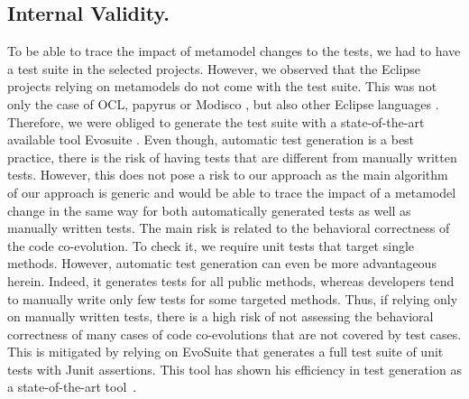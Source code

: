 \subsection{Internal Validity.}
To be able to trace the impact of metamodel changes to the tests, we had to have a test suite in the selected projects. However, we observed that the Eclipse projects relying on metamodels do not come with the test suite. This was not only the case of OCL\cite{MDTOCL}, papyrus \cite{MDTPapyrus} or Modisco \cite{MDTModisco}, but also other Eclipse languages \cite{UML241,BPMN2}. Therefore, we were obliged to generate the test suite with a state-of-the-art available tool Evosuite \cite{fraser2011evosuite}. 
Even though, automatic test generation is a best practice, there is the risk of having tests that are different from manually written tests. 
However, this does not pose a risk to our approach as the main algorithm of our approach is generic and would be able to trace the impact of a metamodel change in the same way for both automatically generated tests as well as manually written tests.  
The main risk is related to the behavioral correctness of the code co-evolution. To check it, we require unit tests that target single methods. 
However, automatic test generation can even be more advantageous herein. Indeed, it generates tests for all public methods, whereas developers tend to manually write only few tests for some targeted methods. Thus, if relying only on manually written tests, there is a high risk of not assessing the behavioral correctness of many cases of code co-evolutions that are not covered by test cases. 
This is mitigated by relying on EvoSuite that generates a full test suite of unit tests with Junit assertions. This tool has shown his efficiency in test generation as a state-of-the-art tool~\cite{DANGLOT2019110398,https://doi.org/10.1002/stvr.1601}. 
 
